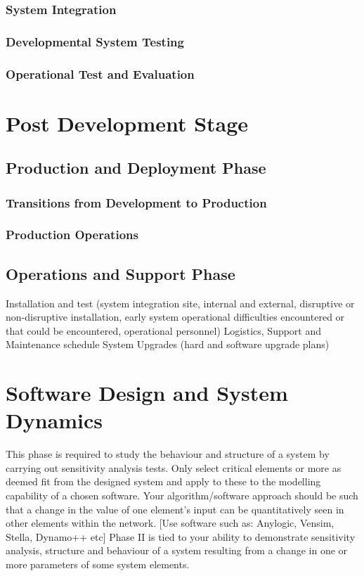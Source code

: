 \documentclass[a4paper,11pt,fleqn]{report}
\begin{document}
\subsection{System Integration}

\subsection{Developmental System Testing}

\subsection{Operational Test and Evaluation}

\chapter{Post Development Stage}

\section{Production and Deployment Phase}

\subsection{Transitions from Development to Production}

\subsection{Production Operations}

\section{Operations and Support Phase}
Installation and test (system integration site, internal and external, disruptive or non-disruptive installation, early system operational difficulties encountered or that could be encountered, operational personnel)
Logistics, Support and Maintenance schedule
System Upgrades (hard and software upgrade plans)

\chapter{Software Design and System Dynamics}
This phase is required to study the behaviour and structure of a system by carrying out sensitivity analysis tests. Only select critical elements or more as deemed fit from the designed system and apply to these to the modelling capability of a chosen software.
Your algorithm/software approach should be such that a change in the value of one element’s input can be quantitatively seen in other elements within the network. [Use software such as: Anylogic, Vensim, Stella, Dynamo++ etc]
Phase II is tied to your ability to demonstrate sensitivity analysis, structure and behaviour of a system resulting from a change in one or more parameters of some system elements.
\end{document}
